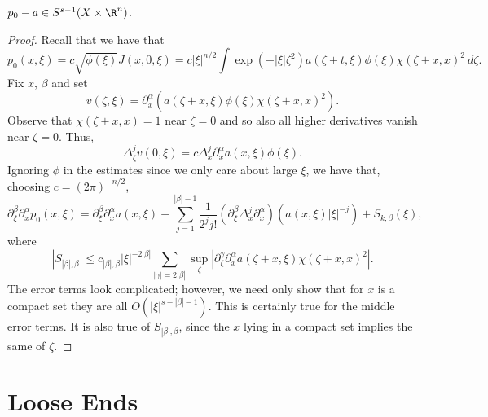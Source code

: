 \documentclass[12pt]{article}
\begin{document}
\begin{prop}$p_0-a \in S^{s-1}(X\times \R^n)$.\end{prop}
\begin{proof}Recall that we have that
\[p_0(x,\xi) = c\sqrt{\phi(\xi)}J(x,0,\xi) = c|\xi|^{n/2}\int \exp(-|\xi|\zeta^2)a(\zeta+t,\xi)\phi(\xi)\chi(\zeta+x,x)^2\ d\zeta.\]
Fix $x$, $\beta$ and set \[v(\zeta,\xi) = \partial_{x}^\alpha(a(\zeta+x,\xi)\phi(\xi)\chi(\zeta+x,x)^2).\] Observe that $\chi(\zeta+x,x) = 1$ near $\zeta = 0$ and so also all higher derivatives vanish near $\zeta=0$. Thus, 
\[\Delta_{\zeta}^j v(0,\xi) = c\Delta_{x}^j\partial_x^{\alpha}a(x,\xi)\phi(\xi).\] Ignoring $\phi$ in the estimates since we only care about large $\xi$, we have that, choosing $c = (2\pi)^{-n/2}$,
\[\partial_{\xi}^{\beta}\partial_{x}^{\alpha} p_0(x,\xi) = \partial_\xi^{\beta}\partial_x^{\alpha} a(x,\xi) + \sum_{j=1}^{|\beta|-1} \frac{1}{2^jj!}(\partial_\xi^{\beta}\Delta_x^j\partial_x^{\alpha}) (a(x,\xi)|\xi|^{-j}) + S_{k,\beta}(\xi),\]
where
\[|S_{|\beta|,\beta}| \leq c_{|\beta|,\beta}|\xi|^{-2|\beta|}\sum_{|\gamma| = 2|\beta|}\sup_{\zeta}|\partial_\zeta^{\gamma}\partial_{x}^\alpha a(\zeta+x,\xi)\chi(\zeta+x,x)^2|.\]
The error terms look complicated; however, we need only show that for $x$ is a compact set they are all $O(|\xi|^{s-|\beta|-1})$. This is certainly true for the middle error terms. It is also true of $S_{|\beta|,\beta}$, since the $x$ lying in a compact set implies the same of $\zeta$.\end{proof}

\section{Loose Ends}
\end{document}
